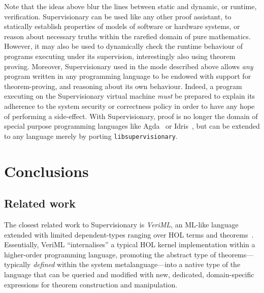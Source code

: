 \documentclass[a4paper, UKenglish, cleveref, autoref, thm-restate, colorlinks]{lipics-v2021}
\begin{document}
Note that the ideas above blur the lines between static and dynamic, or runtime, verification.
Supervisionary can be used like any other proof assistant, to statically establish properties of models of software or hardware systems, or reason about necessary truths within the rarefied domain of pure mathematics.
However, it may also be used to dynamically check the runtime behaviour of programs executing under its supervision, interestingly also using theorem proving.
Moreover, Supervisionary used in the mode described above allows \emph{any} program written in any programming language to be endowed with support for theorem-proving, and reasoning about its own behaviour.
Indeed, a program executing on the Supervisionary virtual machine \emph{must} be prepared to explain its adherence to the system security or correctness policy in order to have any hope of performing a side-effect.
With Supervisionary, proof is no longer the domain of special purpose programming languages like Agda~\cite{DBLP:conf/icfp/Norell13} or Idris~\cite{DBLP:conf/ecoop/Brady21, DBLP:journals/jfp/Brady13}, but can be extended to any language merely by porting \texttt{libsupervisionary}.

\section{Conclusions}
\label{sect.conclusions}

\subsection{Related work}

The closest related work to Supervisionary is \emph{VeriML}, an ML-like language extended with limited dependent-types ranging over HOL terms and theorems~\cite{DBLP:conf/icfp/StampoulisS10}.
Essentially, VeriML ``internalises'' a typical HOL kernel implementation within a higher-order programming language, promoting the abstract type of theorems---typically \emph{defined} within the system metalanguage---into a native type of the language that can be queried and modified with new, dedicated, domain-specific expressions for theorem construction and manipulation.
\end{document}
